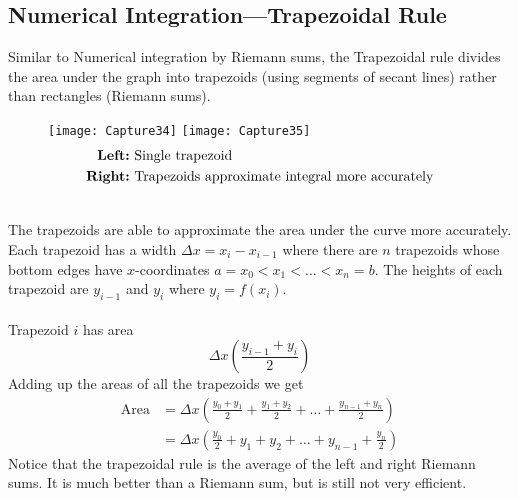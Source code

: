 \documentclass{report}
\begin{document}
\subsection{Numerical Integration---Trapezoidal Rule} %
Similar to Numerical integration by Riemann sums, the Trapezoidal rule
divides the area under the graph into trapezoids (using segments of secant lines)
rather than rectangles (Riemann sums).
\begin{figure}[h]
\texttt{[image: Capture34]}
\texttt{[image: Capture35]}\\
\centering
\begin{align*}
\text{\textbf{Left:}}&\text{ Single trapezoid}\\
\text{\textbf{Right:}}&\text{ Trapezoids approximate integral more accurately}
\end{align*}
\end{figure}\\
The trapezoids are able to approximate the area under the curve more accurately. 
Each trapezoid has a width $\Delta x=x_i-x_{i-1}$ where there
are $n$ trapezoids whose bottom edges have $x$-coordinates 
$a=x_0<x_1<\ldots<x_n=b$. The heights of each trapezoid are $y_{i-1}$ and $y_i$
where $y_{i}=f(x_i)$.\\
\vspace{1mm}\\
Trapezoid $i$ has area 
\begin{equation*}
\Delta x\left(\frac{y_{i-1}+y_i}{2}\right)
\end{equation*}
Adding up the areas of all the trapezoids we get
\begin{align*}
\text{Area}&=\Delta x\left(\frac{y_0+y_1}{2}+
\frac{y_1+y_2}{2}+\ldots+\frac{y_{n-1}+y_n}{2}\right)\\
&=\Delta x\left(\frac{y_0}{2}+y_1+y_2+\ldots+y_{n-1}+
\frac{y_n}{2}\right)
\end{align*}
Notice that the trapezoidal rule is the average of the left and right
Riemann sums. It is much better than a Riemann sum, but is still not very efficient.
\newpage
\end{document}
